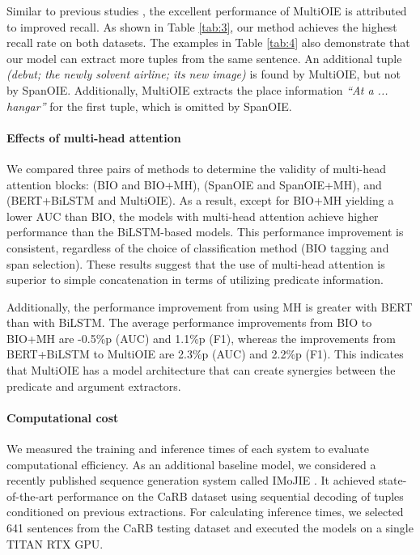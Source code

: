 \documentclass[11pt,a4paper]{article}
\begin{document}
Similar to previous studies \citep{stanovsky-etal-2018-supervised,Zhan2019SpanMF}, the excellent performance of MultiOIE is attributed to improved recall.
As shown in Table \ref{tab:3}, our method achieves the highest recall rate on both datasets.
The examples in Table \ref{tab:4} also demonstrate that our model can extract more tuples from the same sentence.
An additional tuple \emph{(debut; the newly solvent airline; its new image)} is found by MultiOIE, but not by SpanOIE.
Additionally, MultiOIE extracts the place information \emph{``At a ... hangar''} for the first tuple, which is omitted by SpanOIE.

\paragraph{Effects of multi-head attention}
We compared three pairs of methods to determine the validity of multi-head attention blocks: (BIO and BIO+MH), (SpanOIE and SpanOIE+MH), and (BERT+BiLSTM and MultiOIE).
As a result, except for BIO+MH yielding a lower AUC than BIO,
the models with multi-head attention achieve higher performance than the BiLSTM-based models.
This performance improvement is consistent, regardless of the choice of classification method (BIO tagging and span selection).
These results suggest that the use of multi-head attention is superior to simple concatenation in terms of utilizing predicate information.

Additionally, the performance improvement from using MH is greater with BERT than with BiLSTM.
The average performance improvements from BIO to BIO+MH are -0.5\%p (AUC) and 1.1\%p (F1), whereas the improvements from BERT+BiLSTM to MultiOIE are 2.3\%p (AUC) and 2.2\%p (F1).
This indicates that MultiOIE has a model architecture that can create synergies between the predicate and argument extractors.

\paragraph{Computational cost}
We measured the training and inference times of each system to evaluate computational efficiency.
As an additional baseline model, we considered a recently published sequence generation system called IMoJIE \citep{kolluru2020imojie}.
It achieved state-of-the-art performance on the CaRB dataset using sequential decoding of tuples conditioned on previous extractions.
For calculating inference times, we selected 641 sentences from the CaRB testing dataset and executed the models on a single TITAN RTX GPU.
\end{document}
